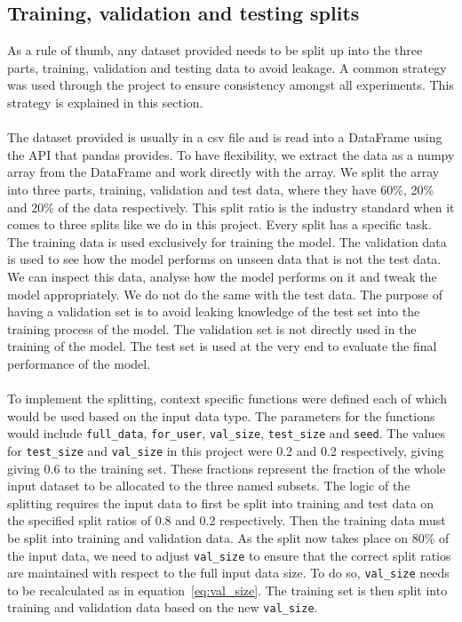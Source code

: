\documentclass[12pt]{article}
\begin{document}
\subsection{Training, validation and testing splits}\label{subsubsec:split}
As a rule of thumb, any dataset provided needs to be split up into the three parts, training, validation and testing data to avoid leakage. A common strategy was used through the project to ensure consistency amongst all experiments. This strategy is explained in this section.
\\\\
The dataset provided is usually in a csv file and is read into a DataFrame using the API that pandas provides. To have flexibility, we extract the data as a numpy array from the DataFrame and work directly with the array. We split the array into three parts, training, validation and test data, where they have 60\%, 20\% and 20\% of the data respectively. This split ratio is the industry standard when it comes to three splits like we do in this project. Every split has a specific task. The training data is used exclusively for training the model. The validation data is used to see how the model performs on unseen data that is not the test data. We can inspect this data, analyse how the model performs on it and tweak the model appropriately. We do not do the same with the test data. The purpose of having a validation set is to avoid leaking knowledge of the test set into the training process of the model. The validation set is not directly used in the training of the model. The test set is used at the very end to evaluate the final performance of the model.
\\\\
To implement the splitting, context specific functions were defined each of which would be used based on the input data type. The parameters for the functions would include \texttt{full\_data}, \texttt{for\_user}, \texttt{val\_size}, \texttt{test\_size} and \texttt{seed}. The values for \texttt{test\_size} and \texttt{val\_size} in this project were 0.2 and 0.2 respectively, giving giving 0.6 to the training set. These fractions represent the fraction of the whole input dataset to be allocated to the three named subsets. The logic of the splitting requires the input data to first be split into training and test data on the specified split ratios of 0.8 and 0.2 respectively. Then the training data must be split into training and validation data. As the split now takes place on 80\% of the input data, we need to adjust \texttt{val\_size} to ensure that the correct split ratios are maintained with respect to the full input data size. To do so, \texttt{val\_size} needs to be recalculated as in equation~\ref{eq:val_size}. The training set is then split into training and validation data based on the new \texttt{val\_size}.
\end{document}
